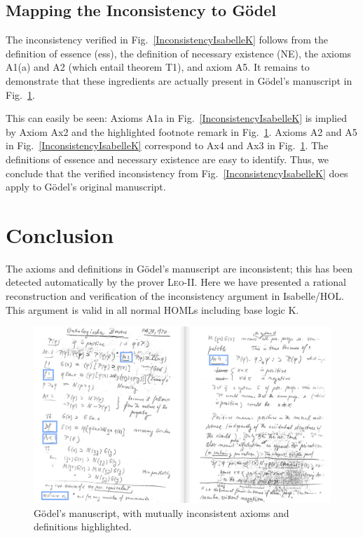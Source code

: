 \documentclass{article}
\begin{document}
\subsection{Mapping the Inconsistency to G\"odel}
The inconsistency verified in Fig.~\ref{InconsistencyIsabelleK} follows from the definition of
essence (ess), the definition of necessary existence (NE), the
axioms A1(a) and A2 (which entail theorem T1), and axiom A5. It remains to demonstrate that
these ingredients are actually present in G\"odel's manuscript in
Fig.~\ref{GoedelScript}. 

This can easily be seen: Axioms A1a in
Fig.~\ref{InconsistencyIsabelleK} is implied by Axiom Ax2 and the
highlighted footnote remark in Fig.~\ref{GoedelScript}. Axioms A2 and
A5 in Fig.~\ref{InconsistencyIsabelleK} correspond to Ax4 and Ax3 in
Fig.~\ref{GoedelScript}. The definitions of essence and necessary
existence are easy to identify. Thus, we conclude that the verified
inconsistency from Fig.~\ref{InconsistencyIsabelleK} does apply to 
G\"odel's original manuscript.


\section{Conclusion}\label{sec:conclusion}
The axioms and definitions in G\"odel's manuscript are inconsistent;
this has been detected automatically by the prover
\textsc{Leo-II}. Here we have presented a rational reconstruction and
verification of the inconsistency argument in Isabelle/HOL. This
argument is valid in all normal HOMLs including base logic K.
\begin{figure}
\centerline{\includegraphics[width=\textwidth]{./Images/Manuscript2.png}}
\caption{G\"{o}del's manuscript, with mutually inconsistent axioms and definitions highlighted.} \label{GoedelScript}
\end{figure}
\end{document}
